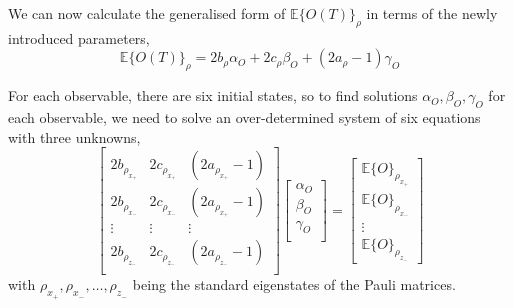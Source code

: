 \documentclass[12pt]{iopart}
\begin{document}
We can now calculate the generalised form of $\mathbb{E}\{O(T)\}_\rho$ in terms of the newly introduced parameters,
\begin{equation}
    \mathbb{E}\{O(T)\}_\rho = 2 b_{\rho} \alpha_{O}  + 2 c_{\rho} \beta_{O} + (2a_{\rho} - 1)\gamma_{O} \label{eq:expectation_as_function_of_parameters}
\end{equation}

For each observable, there are six initial states, so to find solutions $\alpha_{O}, \beta_{O}, \gamma_{O}$ for each observable, we need to solve an over-determined system of six equations with three unknowns,
\begin{equation} \label{eq:overdetermined-full-definition}
    \left[\begin{array}{ccc}
            2b_{\rho_{x_+}} & 2c_{\rho_{x_+}} & (2a_{\rho_{x_+}} - 1) \\
            2b_{\rho_{x_-}} & 2c_{\rho_{x_-}} & (2a_{\rho_{x_+}} - 1) \\
            \vdots          & \vdots          & \vdots                \\
            2b_{\rho_{z_-}} & 2c_{\rho_{z_-}} & (2a_{\rho_{z_-}} - 1) \\
        \end{array}\right]
    \left[\begin{array}{c}
            \alpha_{O} \\
            \beta _{O} \\
            \gamma_{O} \\
        \end{array}\right]
    =
    \left[\begin{array}{c}
            \mathbb{E}\{O\}_{\rho_{x_+}} \\
            \mathbb{E}\{O\}_{\rho_{x_-}} \\
            \vdots                       \\
            \mathbb{E}\{O\}_{\rho_{z_-}}
        \end{array}\right]
\end{equation}
with $\rho_{x_+}, \rho_{x_-}, \ldots, \rho_{z_-}$ being the standard eigenstates of the Pauli matrices.

\end{document}
